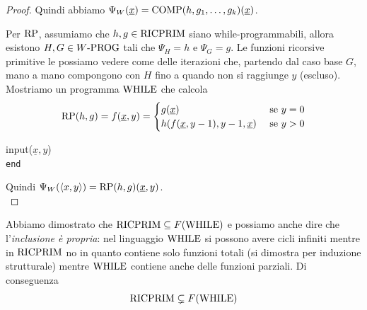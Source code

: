 \begin{proof}
	Quindi abbiamo $\Psi_W (\underline{x}) = \text{COMP} (h, g_1, \dots, g_k) (\underline{x})$.
	
	Per $\text{RP}$, assumiamo che $h,g \in \text{RICPRIM}$ siano while-programmabili, allora esistono $H,G \in W\text{-PROG}$ tali che $\Psi_H = h$ e $\Psi_G = g$. Le funzioni ricorsive primitive le possiamo vedere come delle iterazioni che, partendo dal caso base $G$, mano a mano compongono con $H$ fino a quando non si raggiunge $y$ (escluso). Mostriamo un programma $\text{WHILE}$ che calcola
	$$ 
	\text{RP} (h,g) = f(\underline{x}, y) = \begin{cases}
		g(\underline{x}) & \text{ se } y = 0 \\
		h(f(\underline{x}, y-1), y-1, \underline{x}) & \text{ se } y > 0
	\end{cases}
	$$
	
	\begin{center}
		\begin{minipage}{0.85\textwidth}
			\begin{tcolorbox}[colback=white,sharp corners,boxrule=.3mm]
				\begin{algorithm}[H]
					\SetAlgoNoEnd
					input($\underline{x},y$) \\
					\texttt{end}
				\end{algorithm}
			\end{tcolorbox}
		\end{minipage}
	\end{center}
	
	Quindi $\Psi_W (\langle x,y \rangle) = \text{RP} (h,g) (\underline{x}, y)$.\\
\end{proof}

Abbiamo dimostrato che $\text{RICPRIM} \subseteq F(\text{WHILE})$ e possiamo anche dire che l'\textit{inclusione è propria}: nel linguaggio $\text{WHILE}$ si possono avere cicli infiniti mentre in $\text{RICPRIM}$ no in quanto contiene solo funzioni totali (si dimostra per induzione strutturale) mentre $\text{WHILE}$ contiene anche delle funzioni parziali. Di conseguenza
$$ \text{RICPRIM} \subsetneq F(\text{WHILE}) $$

